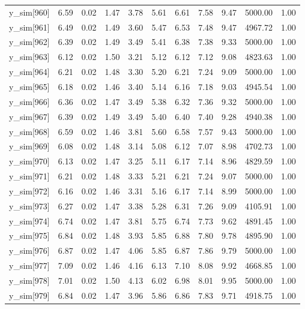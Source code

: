 \begin{table}[ht]
\begin{tabular}{rrrrrrrrrrr}
  y\_sim[960] & 6.59 & 0.02 & 1.47 & 3.78 & 5.61 & 6.61 & 7.58 & 9.47 & 5000.00 & 1.00 \\ 
  y\_sim[961] & 6.49 & 0.02 & 1.49 & 3.60 & 5.47 & 6.53 & 7.48 & 9.47 & 4967.72 & 1.00 \\ 
  y\_sim[962] & 6.39 & 0.02 & 1.49 & 3.49 & 5.41 & 6.38 & 7.38 & 9.33 & 5000.00 & 1.00 \\ 
  y\_sim[963] & 6.12 & 0.02 & 1.50 & 3.21 & 5.12 & 6.12 & 7.12 & 9.08 & 4823.63 & 1.00 \\ 
  y\_sim[964] & 6.21 & 0.02 & 1.48 & 3.30 & 5.20 & 6.21 & 7.24 & 9.09 & 5000.00 & 1.00 \\ 
  y\_sim[965] & 6.18 & 0.02 & 1.46 & 3.40 & 5.14 & 6.16 & 7.18 & 9.03 & 4945.54 & 1.00 \\ 
  y\_sim[966] & 6.36 & 0.02 & 1.47 & 3.49 & 5.38 & 6.32 & 7.36 & 9.32 & 5000.00 & 1.00 \\ 
  y\_sim[967] & 6.39 & 0.02 & 1.49 & 3.49 & 5.40 & 6.40 & 7.40 & 9.28 & 4940.38 & 1.00 \\ 
  y\_sim[968] & 6.59 & 0.02 & 1.46 & 3.81 & 5.60 & 6.58 & 7.57 & 9.43 & 5000.00 & 1.00 \\ 
  y\_sim[969] & 6.08 & 0.02 & 1.48 & 3.14 & 5.08 & 6.12 & 7.07 & 8.98 & 4702.73 & 1.00 \\ 
  y\_sim[970] & 6.13 & 0.02 & 1.47 & 3.25 & 5.11 & 6.17 & 7.14 & 8.96 & 4829.59 & 1.00 \\ 
  y\_sim[971] & 6.21 & 0.02 & 1.48 & 3.33 & 5.21 & 6.21 & 7.24 & 9.07 & 5000.00 & 1.00 \\ 
  y\_sim[972] & 6.16 & 0.02 & 1.46 & 3.31 & 5.16 & 6.17 & 7.14 & 8.99 & 5000.00 & 1.00 \\ 
  y\_sim[973] & 6.27 & 0.02 & 1.47 & 3.38 & 5.28 & 6.31 & 7.26 & 9.09 & 4105.91 & 1.00 \\ 
  y\_sim[974] & 6.74 & 0.02 & 1.47 & 3.81 & 5.75 & 6.74 & 7.73 & 9.62 & 4891.45 & 1.00 \\ 
  y\_sim[975] & 6.84 & 0.02 & 1.48 & 3.93 & 5.85 & 6.88 & 7.80 & 9.78 & 4895.90 & 1.00 \\ 
  y\_sim[976] & 6.87 & 0.02 & 1.47 & 4.06 & 5.85 & 6.87 & 7.86 & 9.79 & 5000.00 & 1.00 \\ 
  y\_sim[977] & 7.09 & 0.02 & 1.46 & 4.16 & 6.13 & 7.10 & 8.08 & 9.92 & 4668.85 & 1.00 \\ 
  y\_sim[978] & 7.01 & 0.02 & 1.50 & 4.13 & 6.02 & 6.98 & 8.01 & 9.95 & 5000.00 & 1.00 \\ 
  y\_sim[979] & 6.84 & 0.02 & 1.47 & 3.96 & 5.86 & 6.86 & 7.83 & 9.71 & 4918.75 & 1.00 \\ 

\end{tabular}
\end{table}
